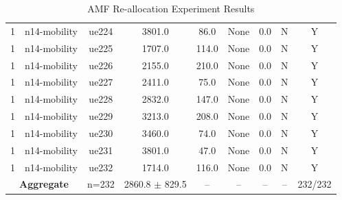 \begin{table}[ht]
\begin{tabular}{|c|c|c|c|c|c|c|c|c|}
1 & n14-mobility & ue224 & 3801.0 & 86.0 & None & 0.0 & N & Y \\
1 & n14-mobility & ue225 & 1707.0 & 114.0 & None & 0.0 & N & Y \\
1 & n14-mobility & ue226 & 2155.0 & 210.0 & None & 0.0 & N & Y \\
1 & n14-mobility & ue227 & 2411.0 & 75.0 & None & 0.0 & N & Y \\
1 & n14-mobility & ue228 & 2832.0 & 147.0 & None & 0.0 & N & Y \\
1 & n14-mobility & ue229 & 3213.0 & 208.0 & None & 0.0 & N & Y \\
1 & n14-mobility & ue230 & 3460.0 & 74.0 & None & 0.0 & N & Y \\
1 & n14-mobility & ue231 & 3801.0 & 47.0 & None & 0.0 & N & Y \\
1 & n14-mobility & ue232 & 1714.0 & 116.0 & None & 0.0 & N & Y \\
\multicolumn{2}{|c|}{\textbf{Aggregate}} & n=232 & 2860.8 $\pm$ 829.5 & -- & -- & -- & -- & 232/232 \\
\hline
\end{tabular}
\caption{AMF Re-allocation Experiment Results}
\label{tab:amf_realloc}
\end{table}
